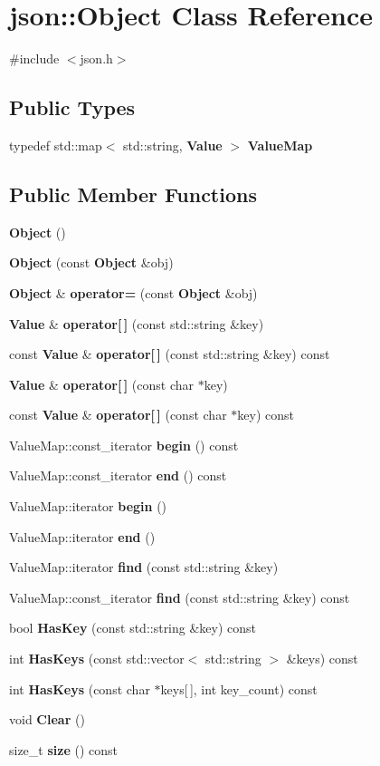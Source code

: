\section{json\+:\+:Object Class Reference}
\label{classjson_1_1_object}


{\ttfamily \#include $<$json.\+h$>$}

\subsection*{Public Types}
\begin{DoxyCompactItemize}
\item 
typedef std\+::map$<$ std\+::string, {\bf Value} $>$ {\bf Value\+Map}
\end{DoxyCompactItemize}
\subsection*{Public Member Functions}
\begin{DoxyCompactItemize}
\item 
{\bf Object} ()
\item 
{\bf Object} (const {\bf Object} \&obj)
\item 
{\bf Object} \& {\bf operator=} (const {\bf Object} \&obj)
\item 
{\bf Value} \& {\bf operator[$\,$]} (const std\+::string \&key)
\item 
const {\bf Value} \& {\bf operator[$\,$]} (const std\+::string \&key) const 
\item 
{\bf Value} \& {\bf operator[$\,$]} (const char $\ast$key)
\item 
const {\bf Value} \& {\bf operator[$\,$]} (const char $\ast$key) const 
\item 
Value\+Map\+::const\+\_\+iterator {\bf begin} () const 
\item 
Value\+Map\+::const\+\_\+iterator {\bf end} () const 
\item 
Value\+Map\+::iterator {\bf begin} ()
\item 
Value\+Map\+::iterator {\bf end} ()
\item 
Value\+Map\+::iterator {\bf find} (const std\+::string \&key)
\item 
Value\+Map\+::const\+\_\+iterator {\bf find} (const std\+::string \&key) const 
\item 
bool {\bf Has\+Key} (const std\+::string \&key) const 
\item 
int {\bf Has\+Keys} (const std\+::vector$<$ std\+::string $>$ \&keys) const 
\item 
int {\bf Has\+Keys} (const char $\ast$keys[$\,$], int key\+\_\+count) const 
\item 
void {\bf Clear} ()
\item 
size\+\_\+t {\bf size} () const 
\end{DoxyCompactItemize}
